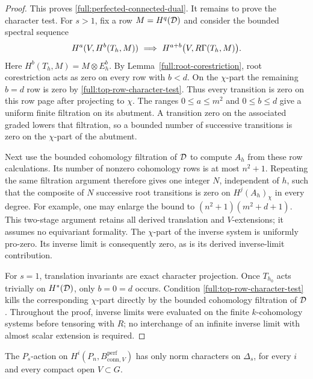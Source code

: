 \begin{proof}
This proves \eqref{full:perfected-connected-dual}.
It remains to prove the character test.
For $s>1$, fix a row $M=H^q(\mathcal D)$ and consider the
bounded spectral sequence
\[
 H^a(V,H^b(T_h,M))
       \ \Longrightarrow\
 H^{a+b}\bigl(V,R\Gamma(T_h,M)\bigr).
\]
Here $H^b(T_h,M)=M\otimes E_h^b$.
By Lemma~\ref{full:root-corestriction}, root corestriction
acts as zero on every row with $b<d$.
On the $\chi$-part the remaining $b=d$ row is zero by
\eqref{full:top-row-character-test}.
Thus every transition is zero on this row page after
projecting to $\chi$.
The ranges $0\leq a\leq m^2$ and $0\leq b\leq d$ give a
uniform finite filtration on its abutment.
A transition zero on the associated graded lowers that
filtration, so a bounded number of successive transitions
is zero on the $\chi$-part of the abutment.

Next use the bounded cohomology filtration of $\mathcal D$ to compute
$A_h$ from these row calculations.
Its number of nonzero cohomology rows is at most $n^2+1$.
Repeating the same filtration argument therefore gives one
integer $N$, independent of $h$, such that the composite of
$N$ successive root transitions is zero on
$H^j(A_h)_\chi$ in every degree.
For example, one may enlarge the bound to
$(n^2+1)(m^2+d+1)$.
This two-stage argument retains all derived translation and
$V$-extensions; it assumes no equivariant formality.
The $\chi$-part of the inverse system is uniformly pro-zero.
Its inverse limit is consequently zero, as is its derived
inverse-limit contribution.

For $s=1$, translation invariants are exact character projection.
Once $T_{h_0}$ acts trivially on $H^*(\mathcal D)$, only $b=0=d$
occurs.  Condition \eqref{full:top-row-character-test} kills
the corresponding $\chi$-part directly by the bounded
cohomology filtration of $\mathcal D$.
Throughout the proof, inverse limits were evaluated on the
finite $k$-cohomology systems before tensoring with $R$;
no interchange of an infinite inverse limit with almost
scalar extension is required.
\end{proof}

\begin{lemma}
\label{full:perfected-support-characters}
The $P_s$-action on
$H^i(P_n,B_{\mathrm{conn},V}^{\mathrm{perf}})$
has only norm characters on $\Delta_s$, for every $i$ and every
compact open $V\subset G$.
\end{lemma}

